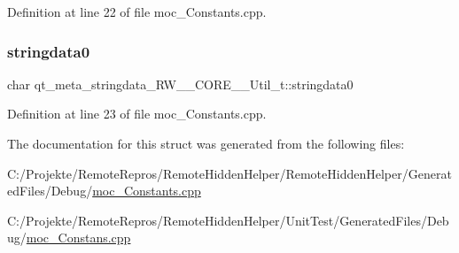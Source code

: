 Definition at line 22 of file moc\+\_\+\+Constants.\+cpp.

\hypertarget{structqt__meta__stringdata___r_w_____c_o_r_e_____util__t_ae4c649acc1dcaa7ab6a3292e3843a63e}{}\label{structqt__meta__stringdata___r_w_____c_o_r_e_____util__t_ae4c649acc1dcaa7ab6a3292e3843a63e} 
\subsubsection{\texorpdfstring{stringdata0}{stringdata0}}
{\footnotesize\ttfamily char qt\+\_\+meta\+\_\+stringdata\+\_\+\+R\+W\+\_\+\+\_\+\+C\+O\+R\+E\+\_\+\+\_\+\+Util\+\_\+t\+::stringdata0}



Definition at line 23 of file moc\+\_\+\+Constants.\+cpp.



The documentation for this struct was generated from the following files\+:\begin{DoxyCompactItemize}
\item 
C\+:/\+Projekte/\+Remote\+Repros/\+Remote\+Hidden\+Helper/\+Remote\+Hidden\+Helper/\+Generated\+Files/\+Debug/\hyperlink{moc___constants_8cpp}{moc\+\_\+\+Constants.\+cpp}\item 
C\+:/\+Projekte/\+Remote\+Repros/\+Remote\+Hidden\+Helper/\+Unit\+Test/\+Generated\+Files/\+Debug/\hyperlink{moc___constans_8cpp}{moc\+\_\+\+Constans.\+cpp}\end{DoxyCompactItemize}
